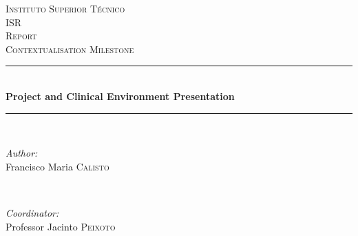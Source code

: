 \begin{titlepage}

\newcommand{\HRule}{\rule{\linewidth}{0.5mm}} %

\center %
 

\textsc{\LARGE Instituto Superior T\'{e}cnico}\\[1.5cm]
\textsc{\Large ISR}\\[0.5cm]
\textsc{\large Report}\\[0.25cm]
\textsc{\small Contextualisation Milestone}\\[0.25cm]


\HRule \\[0.5cm]
{ \large \bfseries Project and Clinical Environment Presentation}\\[0.25cm] %
\HRule \\[0.5cm]
 

\begin{minipage}{0.4\textwidth}
\begin{flushleft} \large
\emph{Author:}\\
Francisco Maria \textsc{Calisto} %
\end{flushleft}
\end{minipage}
~
\begin{minipage}{0.4\textwidth}
\begin{flushright} \large
\emph{Coordinator:} \\
Professor Jacinto \textsc{Peixoto} %
\end{flushright}
\end{minipage}\\[2cm]


\end{titlepage}
